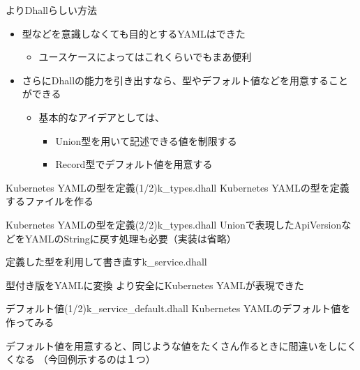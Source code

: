 \documentclass[unicode,12pt]{beamer}
\begin{document}
\begin{frame}{よりDhallらしい方法}
  \begin{itemize}
  \item 型などを意識しなくても目的とするYAMLはできた
    \begin{itemize}
    \item ユースケースによってはこれくらいでもまあ便利
    \end{itemize}
  \item さらにDhallの能力を引き出すなら、型やデフォルト値などを用意することができる
    \begin{itemize}
    \item 基本的なアイデアとしては、 
      \begin{itemize}
      \item Union型を用いて記述できる値を制限する
      \item Record型でデフォルト値を用意する
      \end{itemize}
    \end{itemize}
  \end{itemize}
\end{frame}

\begin{frame}{Kubernetes YAMLの型を定義(1/2)}{\ttfamily k\_types.dhall}
  Kubernetes YAMLの型を定義するファイルを作る
  
\end{frame}

\begin{frame}{Kubernetes YAMLの型を定義(2/2)}{\ttfamily k\_types.dhall}
  Unionで表現した{\ttfamily ApiVersion}などをYAMLのStringに戻す処理も必要（実装は省略）
  
\end{frame}

\begin{frame}{定義した型を利用して書き直す}{\ttfamily k\_service.dhall}
  
\end{frame}

\begin{frame}{型付き版をYAMLに変換}
  より安全にKubernetes YAMLが表現できた
  
\end{frame}

\begin{frame}{デフォルト値(1/2)}{\ttfamily k\_service\_default.dhall}
  Kubernetes YAMLのデフォルト値を作ってみる
  
  デフォルト値を用意すると、同じような値をたくさん作るときに間違いをしにくくなる
  （今回例示するのは１つ）
\end{frame}
\end{document}
